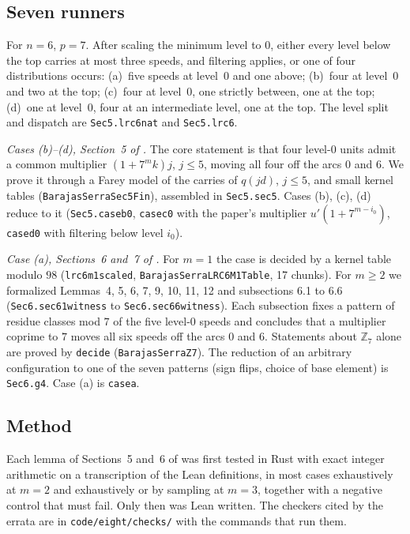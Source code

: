 \documentclass[11pt]{amsart}
\theoremstyle{plain}
\theoremstyle{definition}
\theoremstyle{remark}
\newcommand{\Z}{\mathbb{Z}}
\newcommand{\lean}[1]{{\def\_{\textunderscore\allowbreak}\def\.{.\allowbreak}\texttt{#1}}}
\begin{document}
\subsection{Seven runners}
For $n=6$, $p=7$. After scaling the minimum level to $0$, either every level below the top
carries at most three speeds, and filtering applies, or one of four distributions occurs:
(a)~five speeds at level~$0$ and one above; (b)~four at level~$0$ and two at the top; (c)~four at
level~$0$, one strictly between, one at the top; (d)~one at level~$0$, four at an intermediate
level, one at the top. The level split and dispatch are \lean{Sec5.lrc6\_nat} and \lean{Sec5.lrc6}.

\emph{Cases (b)--(d), Section~5 of \cite{bs}.} The core statement is that four level-$0$ units
admit a common multiplier $(1+7^mk)j$, $j\le5$, moving all four off the arcs $0$ and $6$. We prove
it through a Farey model of the carries of $q(jd)$, $j\le5$, and small kernel tables
(\lean{BarajasSerraSec5Fin}), assembled in \lean{Sec5.sec5}. Cases (b), (c), (d) reduce to it
(\lean{Sec5.case\_b0}, \lean{case\_c0} with the paper's multiplier $u'(1+7^{m-i_0})$,
\lean{case\_d0} with filtering below level $i_0$).

\emph{Case (a), Sections~6 and~7 of \cite{bs}.} For $m=1$ the case is decided by a kernel table
modulo $98$ (\lean{lrc6\_m1\_scaled}, \lean{BarajasSerraLRC6M1Table}, 17 chunks). For $m\ge2$ we
formalized Lemmas~4, 5, 6, 7, 9, 10, 11, 12 and subsections 6.1 to 6.6 (\lean{Sec6.sec61\_witness}
to \lean{Sec6.sec66\_witness}). Each subsection fixes a pattern of residue classes mod $7$ of the
five level-$0$ speeds and concludes that a multiplier coprime to $7$ moves all six speeds off the
arcs $0$ and $6$. Statements about $\Z_7$ alone are proved by \lean{decide}
(\lean{BarajasSerraZ7}). The reduction of an arbitrary configuration to one of the seven patterns
(sign flips, choice of base element) is \lean{Sec6.g4}. Case (a) is \lean{case\_a}.

\subsection{Method}
Each lemma of Sections~5 and~6 of \cite{bs} was first tested in Rust with exact integer arithmetic
on a transcription of the Lean definitions, in most cases exhaustively at $m=2$ and exhaustively or
by sampling at $m=3$, together with a negative control that must fail. Only then was Lean written.
The checkers cited by the errata are in \texttt{code/eight/checks/} with the commands that run them.
\end{document}
